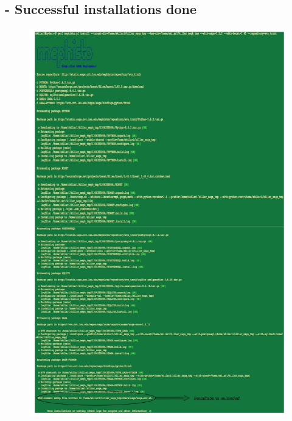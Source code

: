 \documentclass[a4paper,10pt]{article}
\begin{document}
\subsection*{- Successful installations done}
\begin{figure}[H]
\begin{center}
\includegraphics[scale=0.60]{install_succ.jpg}
\end{center}
\end{figure}
\end{document}
